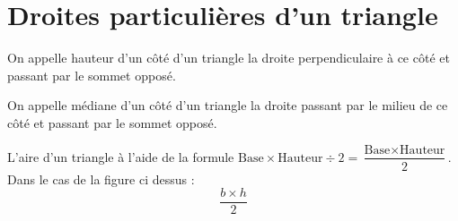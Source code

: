 \section{Droites particulières d'un triangle}

{On appelle hauteur d'un côté d'un triangle la droite perpendiculaire à ce côté et passant par le sommet opposé.}


{On appelle médiane d'un côté d'un triangle la droite passant par le milieu de ce côté et passant par le sommet opposé.}

    {\begin{multicols}{2}
        \begin{figure}[H]
            \centering
        \end{figure}
        \begin{figure}[H]
            \centering
        \end{figure}
    \end{multicols}
    L'aire d'un triangle à l'aide de la formule $\text{Base}\times\text{Hauteur}\div 2=\dfrac{\text{Base}\times\text{Hauteur}}{2}$. Dans le cas de la figure ci dessus :
    $$\dfrac{b\times h}{2}$$
    }

